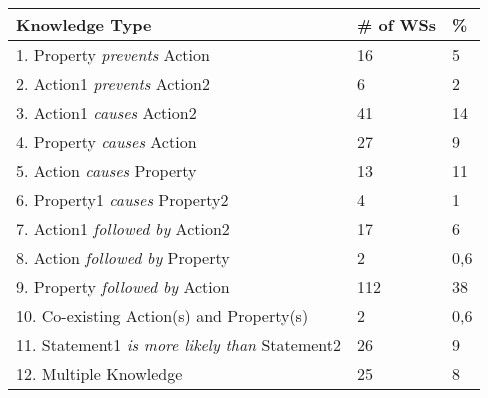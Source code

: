 

\begin{tabular}{ l | l | l }
    
    \textbf{Knowledge Type} & \textbf{\# of WSs} & \% \\\hline
    1. Property \textit{prevents} Action  & 16 & 5\\\hline
    2. Action1 \textit{prevents} Action2  & 6 & 2\\\hline
    3. Action1 \textit{causes} Action2 & 41 & 14\\\hline
    4. Property \textit{causes} Action & 27 & 9\\\hline
    5. Action \textit{causes} Property & 13 & 11\\\hline
    6. Property1 \textit{causes} Property2 & 4 & 1\\\hline
    7. Action1 \textit{followed by} Action2  & 17 & 6\\\hline
    8. Action \textit{followed by} Property & 2 & 0,6\\\hline
    9. Property \textit{followed by} Action &112 & 38 \\\hline
    10. Co-existing Action(s) and Property(s)& 2 & 0,6\\\hline
    11. Statement1 \textit{is more likely than} Statement2 &26 & 9\\\hline
    12. Multiple Knowledge  &25 & 8
\end{tabular}


